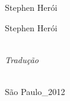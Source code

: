 
{\centering\vspace*{12em}\thispagestyle{empty}
{\huge Stephen Herói}\par}

\cleardoublepage

{\centering\vspace*{12em}\thispagestyle{empty}
{\huge Stephen Herói}\\\bigskip
{\Large{}}

\vspace*{14em}
{}\\
{\small\textit{Tradução}}\medskip

\vfill

\logoum\\
{\normalsize São Paulo\_2012}\par}

\clearpage

